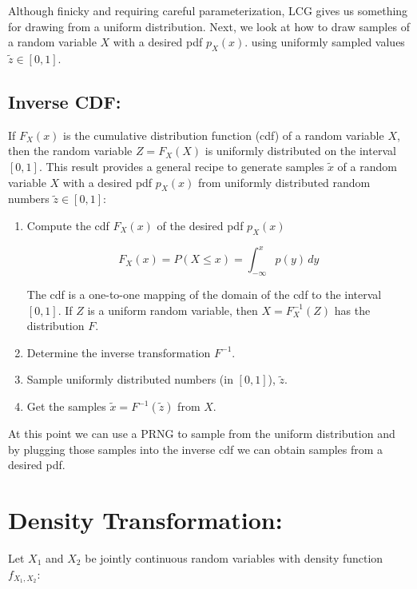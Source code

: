 Although finicky and requiring careful parameterization, LCG gives us something for drawing from a uniform distribution. 
Next, we look at how to draw samples of a random variable $X$ with a desired pdf $p_X(x)$. 
using uniformly sampled values $\tilde z \in [0,1]$.

\subsection{Inverse CDF:}

If $F_{X}(x)$ is the cumulative
  distribution function (cdf) of a random variable $X$, then the
random variable $Z = F_{X}(X)$ is uniformly distributed on the
interval $[0,1]$. This result provides 
a general recipe to generate
samples $\tilde x$ of a random variable $X$ with a desired pdf $p_X(x)$
from uniformly distributed random numbers $\tilde z \in [0,1]$:
\begin{enumerate}
\item Compute the cdf $F_X(x)$ of the desired pdf $p_X(x)$

\begin{equation}
F_X(x) = P(X \leq x) = \int_{-\infty}^{x} p(y)\,dy
\end{equation}

The cdf is a one-to-one mapping of the domain of the cdf to the interval $[0,1]$.
 If $Z$ is a uniform random variable, then $X=F_X^{-1}(Z)$ has the distribution $F$.

\item Determine the inverse transformation $F^{-1}$.

\item Sample uniformly distributed numbers (in $[0,1]$), $\tilde z$.
\item Get the samples $\tilde x=F^{-1}(\tilde z)$ from $X$. 
\end{enumerate}

At this point we can use a PRNG to sample from the uniform distribution and 
by plugging those samples into the inverse cdf we can obtain samples from a desired pdf.

\newpage

\section{Density Transformation:}

Let $X_1$ and $X_2$ be jointly continuous random variables with 
density function $f_{X_1, X_2}$:

